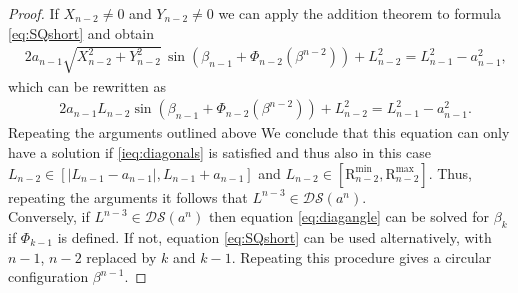 \documentclass[10pt,a4paper]{article}
\theoremstyle{definition}
\theoremstyle{remark}
\numberwithin{equation}{section}
\begin{document}
\begin{proof}
If $X_{n-2} \neq 0 $ and  $Y_{n-2} \neq 0 $ we can apply the addition theorem to formula \eqref{eq:SQshort} and obtain   
\begin{align*}
& 2 a_{n-1} \sqrt{  X_{n-2}^2 + Y_{n-2}^2 } \, \sin\left( \beta_{n-1} + \Phi_{n-2}\left(\beta^{n-2} \right)  \right) + L_{n-2}^2  = L_{n-1}^2 - a_{n-1}^2,   
\end{align*}
which can be rewritten as 
\begin{align*}
& 2 a_{n-1} L_{n-2} \sin\left( \beta_{n-1} + \Phi_{n-2}\left(\beta^{n-2} \right)  \right) + L_{n-2}^2  = L_{n-1}^2 - a_{n-1}^2.   
\end{align*}
Repeating the arguments outlined above We conclude  that this equation can only have a solution if \eqref{ieq:diagonals} is satisfied and thus also in this case $L_{n-2}  \in  [ |L_{n-1} -a_{n-1}|,  L_{n-1} +a_{n-1} ]$ and $L_{n-2} \in [\mathrm{R}_{n-2}^{\min}, \mathrm{    R}_{n-2}^{\max}]$. Thus, repeating the arguments it follows that $L^{n-3} \in \mathcal{DS}(a^n)$.\\
       
Conversely, if $L^{n-3} \in \mathcal{DS}(a^n)$ then  equation \eqref{eq:diagangle} can be solved for $\beta_k$ if $\Phi_{k-1}$ is defined. If not, equation \eqref{eq:SQshort} can be used alternatively, with $n-1$, $n-2$ replaced by $k$ and $k-1$. Repeating this procedure gives a circular configuration $\beta^{n-1}$. 
\end{proof}
\end{document}
